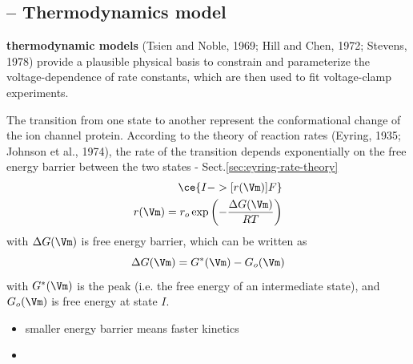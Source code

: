 \subsection{-- Thermodynamics model}

{\bf thermodynamic models} (Tsien and Noble, 1969; Hill and Chen, 1972; Stevens,
1978) provide a plausible physical basis to constrain and parameterize the
voltage-dependence of rate constants, which are then used to fit voltage-clamp
experiments.

The transition from one state to another represent the conformational change of
the ion channel protein. According to the theory of reaction rates (Eyring,
1935; Johnson et al., 1974), the rate of the transition depends exponentially on
the free energy barrier between the two states - Sect.\ref{sec:eyring-rate-theory}
\begin{equation}
\begin{split}
\ce{I ->[r(\Vm)] F} \\
r(\Vm) = r_o \exp\left( -\frac{\Delta G(\Vm)}{RT} \right)
\end{split}
\end{equation}
with $\Delta G(\Vm)$ is free energy barrier, which can be written as
\begin{equation}
\Delta G(\Vm) = G^\ast(\Vm) - G_o(\Vm)
\end{equation}
with $G^\ast(\Vm)$ is the peak (i.e. the free energy of an intermediate state),
and $G_o(\Vm)$ is free energy at state $I$.
\begin{itemize}
  \item smaller energy barrier means faster kinetics

  \item
\end{itemize}

